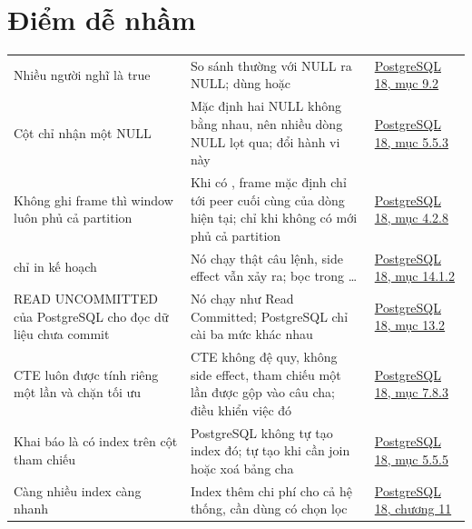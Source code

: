 \section{Điểm dễ nhầm}

\begin{xltabular}{\textwidth}{@{}P{3.8cm} L P{3.4cm}@{}}
\toprule
{} &  &  \\
\midrule
\endhead
\bottomrule
\endfoot
Nhiều người nghĩ  là true & So sánh thường với NULL ra NULL; dùng  hoặc  & \href{https://www.postgresql.org/docs/current/functions-comparison.html}{PostgreSQL 18, mục 9.2} \\
Cột  chỉ nhận một NULL & Mặc định hai NULL không bằng nhau, nên nhiều dòng NULL lọt qua;  đổi hành vi này & \href{https://www.postgresql.org/docs/current/ddl-constraints.html}{PostgreSQL 18, mục 5.5.3} \\
Không ghi frame thì window luôn phủ cả partition & Khi có , frame mặc định chỉ tới peer cuối cùng của dòng hiện tại; chỉ khi không có  mới phủ cả partition & \href{https://www.postgresql.org/docs/current/sql-expressions.html}{PostgreSQL 18, mục 4.2.8} \\
 chỉ in kế hoạch & Nó chạy thật câu lệnh, side effect vẫn xảy ra; bọc trong  …  & \href{https://www.postgresql.org/docs/current/using-explain.html}{PostgreSQL 18, mục 14.1.2} \\
READ UNCOMMITTED của PostgreSQL cho đọc dữ liệu chưa commit & Nó chạy như Read Committed; PostgreSQL chỉ cài ba mức khác nhau & \href{https://www.postgresql.org/docs/current/transaction-iso.html}{PostgreSQL 18, mục 13.2} \\
CTE luôn được tính riêng một lần và chặn tối ưu & CTE không đệ quy, không side effect, tham chiếu một lần được gộp vào câu cha;  điều khiển việc đó & \href{https://www.postgresql.org/docs/current/queries-with.html}{PostgreSQL 18, mục 7.8.3} \\
Khai báo  là có index trên cột tham chiếu & PostgreSQL không tự tạo index đó; tự tạo khi cần join hoặc xoá bảng cha & \href{https://www.postgresql.org/docs/current/ddl-constraints.html}{PostgreSQL 18, mục 5.5.5} \\
Càng nhiều index càng nhanh & Index thêm chi phí cho cả hệ thống, cần dùng có chọn lọc & \href{https://www.postgresql.org/docs/current/indexes.html}{PostgreSQL 18, chương 11} \\

\end{xltabular}
